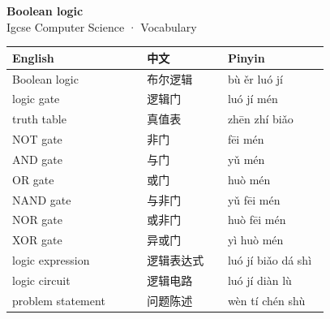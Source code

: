 \documentclass[11pt]{article}
\begin{document}
\begin{center}
  {\LARGE\bfseries Boolean logic}\\[0.35em]
  {\large Igcse Computer Science · Vocabulary}
\end{center}
\vspace{0.6em}

\begin{longtable}{@{}p{0.40\linewidth}p{0.24\linewidth}p{0.30\linewidth}@{}}
\toprule
\textbf{English} & \textbf{中文} & \textbf{Pinyin} \\
\midrule
\endhead
\bottomrule
\endlastfoot
Boolean logic & 布尔逻辑 & bù ěr luó jí \\
logic gate & 逻辑门 & luó jí mén \\
truth table & 真值表 & zhēn zhí biǎo \\
NOT gate & 非门 & fēi mén \\
AND gate & 与门 & yǔ mén \\
OR gate & 或门 & huò mén \\
NAND gate & 与非门 & yǔ fēi mén \\
NOR gate & 或非门 & huò fēi mén \\
XOR gate & 异或门 & yì huò mén \\
logic expression & 逻辑表达式 & luó jí biǎo dá shì \\
logic circuit & 逻辑电路 & luó jí diàn lù \\
problem statement & 问题陈述 & wèn tí chén shù \\
\end{longtable}
\end{document}
